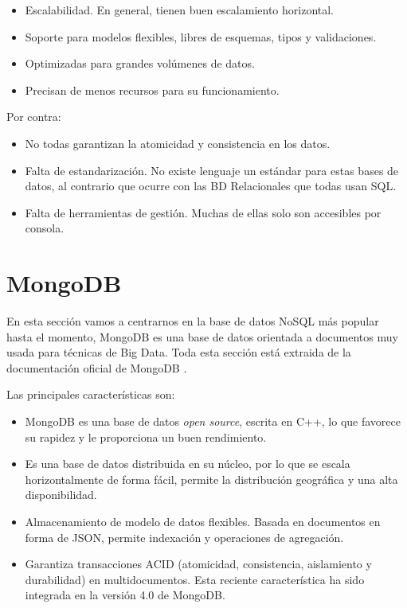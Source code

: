 \begin{itemize}
    \item Escalabilidad. En general, tienen buen escalamiento horizontal.
    \item Soporte para modelos flexibles, libres de esquemas, tipos y validaciones.
    \item Optimizadas para grandes volúmenes de datos.
    \item Precisan de menos recursos para su funcionamiento.
\end{itemize}

Por contra:

\begin{itemize}
    \item No todas garantizan la atomicidad y consistencia en los datos.
    \item Falta de estandarización. No existe lenguaje un estándar para estas bases de datos, al contrario que ocurre con las BD Relacionales que todas usan SQL.
    \item Falta de herramientas de gestión. Muchas de ellas solo son accesibles por consola.
\end{itemize}

\section{MongoDB}

En esta sección vamos a centrarnos en la base de datos NoSQL más popular hasta el momento, MongoDB es una base de datos orientada a documentos muy usada para técnicas de Big Data. Toda esta sección está extraida de la documentación oficial de MongoDB \cite{mongodb}.

Las principales características son:

\begin{itemize}
    \item MongoDB es una base de datos \textit{open source}, escrita en C++, lo que favorece su rapidez y le proporciona un buen rendimiento.
    \item Es una base de datos distribuida en su núcleo, por lo que se escala horizontalmente de forma fácil, permite la distribución geográfica y una alta disponibilidad.
    \item Almacenamiento de modelo de datos flexibles. Basada en documentos en forma de JSON, permite indexación y operaciones de agregación.
    \item Garantiza transacciones ACID (atomicidad, consistencia, aislamiento y durabilidad) en multidocumentos. Esta reciente característica ha sido integrada en la versión 4.0 de MongoDB.
\end{itemize}

